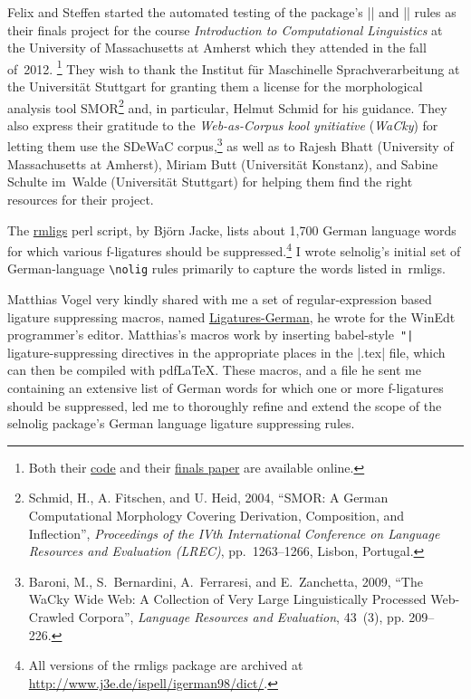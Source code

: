 \documentclass[11pt]{article}
\newcommand{\pkg}[1]{\textsf{#1}}
\newcommand{\cmmd}[1]{\texttt{\textbackslash #1}}
\begin{document}
Felix and Steffen started the automated testing of the package's |\nolig| and |\keeplig| rules as their finals project for the course \emph{Introduction to Computational Linguistics} at the University of Massachusetts at Amherst which they attended in the fall of~2012.%
\footnote{Both their \href{https://github.com/SHildebrandt/selnolig-check}{code} and their \href{https://github.com/SHildebrandt/selnolig-check/blob/master/selnolig-check-documentation.pdf?raw=true}{finals paper} are available online.} They wish to thank the Institut für Maschinelle Sprachverarbeitung at the Universität Stuttgart for granting them a license for the morphological analysis tool SMOR\footnote{Schmid, H., A. Fitschen, and U. Heid, 2004, \enquote{SMOR: A German Computational Morphology Covering Derivation, Composition, and Inflection}, \emph{Proceedings of the IVth International Conference on Language Resources and Evaluation (LREC)}, pp.~1263--1266, Lisbon, Portugal.} and, in particular, Helmut Schmid for his guidance. They also express their gratitude to the \emph{Web-as-Corpus kool ynitiative} (\emph{WaCky}) for letting them use the SDeWaC corpus,\footnote{Baroni, M., S.~Bernardini, A.~Ferraresi, and E.~Zanchetta, 2009, \enquote{The WaCky Wide Web: A Collection of Very Large Linguistically Processed Web-Crawled Corpora}, \emph{Language Resources and Evaluation}, 43~(3), pp. 209--226.} as well as to Rajesh Bhatt (University of Massachusetts at Amherst), Miriam Butt (Universität Konstanz), and Sabine Schulte im~Walde (Universität Stuttgart) for helping them find the right resources for their project.

The \href{http://www.ctan.org/tex-archive/support/rmligs}{\pkg{rmligs}} perl script, by Björn Jacke, lists about 1,700 German language words for which various f-ligatures should be suppressed.\footnote{All versions of the \pkg{rmligs} package are archived at \url{http://www.j3e.de/ispell/igerman98/dict/}.} I wrote \pkg{selnolig}'s initial set of German-language \cmmd{nolig} rules primarily to capture the words listed in~\pkg{rmligs}. 

Matthias Vogel very kindly shared with me a set of regular-expression based ligature suppressing macros, named \href{http://www.winedt.org/Macros/LaTeX/Ligatures-German.php}{Ligatures-German}, he wrote for the WinEdt programmer's editor. Matthias's macros work by inserting \pkg{babel}-style~\Verb+"|+ ligature-suppressing  directives in the appropriate places in the |.tex| file, which can then be compiled with pdf\LaTeX. These macros, and a file he sent me containing an extensive list of German words for which one or more f-ligatures should be suppressed, led me to thoroughly refine and extend the scope of the \pkg{selnolig} package's German language ligature suppressing rules.
\end{document}
